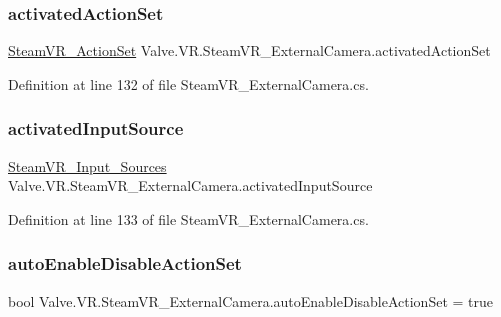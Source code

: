 \subsubsection{\texorpdfstring{activatedActionSet}{activatedActionSet}}
{\footnotesize\ttfamily \mbox{\hyperlink{class_valve_1_1_v_r_1_1_steam_v_r___action_set}{Steam\+V\+R\+\_\+\+Action\+Set}} Valve.\+V\+R.\+Steam\+V\+R\+\_\+\+External\+Camera.\+activated\+Action\+Set\hspace{0.3cm}{\ttfamily [protected]}}



Definition at line 132 of file Steam\+V\+R\+\_\+\+External\+Camera.\+cs.

\mbox{\label{class_valve_1_1_v_r_1_1_steam_v_r___external_camera_a18ba0e86cb9d7d8ab754f7360dcbac5a}} 
\subsubsection{\texorpdfstring{activatedInputSource}{activatedInputSource}}
{\footnotesize\ttfamily \mbox{\hyperlink{namespace_valve_1_1_v_r_a82e5bf501cc3aa155444ee3f0662853f}{Steam\+V\+R\+\_\+\+Input\+\_\+\+Sources}} Valve.\+V\+R.\+Steam\+V\+R\+\_\+\+External\+Camera.\+activated\+Input\+Source\hspace{0.3cm}{\ttfamily [protected]}}



Definition at line 133 of file Steam\+V\+R\+\_\+\+External\+Camera.\+cs.

\mbox{\label{class_valve_1_1_v_r_1_1_steam_v_r___external_camera_a9972bde4351b9d77cc1123a2fa1edc83}} 
\subsubsection{\texorpdfstring{autoEnableDisableActionSet}{autoEnableDisableActionSet}}
{\footnotesize\ttfamily bool Valve.\+V\+R.\+Steam\+V\+R\+\_\+\+External\+Camera.\+auto\+Enable\+Disable\+Action\+Set = true}



